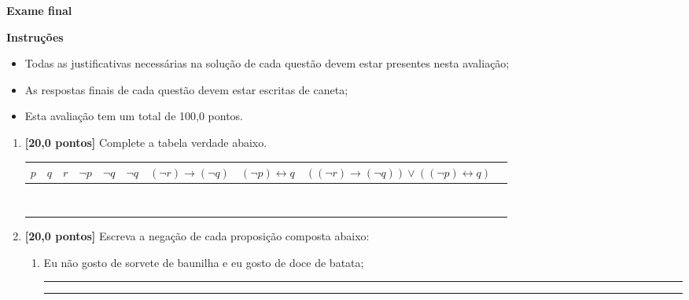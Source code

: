 \documentclass[12pt,a4paper]{article}
\begin{document}
\begin{center}
 \textbf{Exame final}
\end{center}

\textbf{Instruções}
\begin{itemize}
 \item Todas as justificativas necessárias na solução de cada questão devem 
 estar presentes nesta avaliação;
 \item As respostas finais de cada questão devem estar escritas de caneta;
 \item Esta avaliação tem um total de 100,0 pontos.
\end{itemize}

\begin{enumerate}
  \item \textbf{[20,0 pontos]} Complete a tabela verdade abaixo.

  \begin{center}
    \begin{tabular}{|c|c|c|c|c|c|c|c|c|c|}
      \hline
      $p$ & $q$ & $r$ & $\lnot p$ & $\lnot q$ & 
      $\lnot q$ & $(\lnot r) \rightarrow (\lnot q)$ & 
      $(\lnot p)\leftrightarrow q$ & 
      $((\lnot r) \rightarrow (\lnot q))\vee ((\lnot p)\leftrightarrow q)$\\ \hline
       & & & & & & & & \\ \hline
       & & & & & & & &  \\ \hline
       & & & & & & & &  \\ \hline
       & & & & & & & &  \\ \hline
       & & & & & & & &  \\ \hline
       & & & & & & & &  \\ \hline
       & & & & & & & &  \\ \hline
       & & & & & & & &  \\ \hline
    \end{tabular}
  \end{center}

  \item \textbf{[20,0 pontos]} Escreva a negação de cada proposição composta abaixo:

    \begin{enumerate}
      \item Eu não gosto de sorvete de baunilha e eu gosto de doce de batata;

      \rule{\linewidth}{0.1mm}
      
      \rule{\linewidth}{0.1mm}
            

\end{enumerate}
\end{enumerate}
\end{document}
